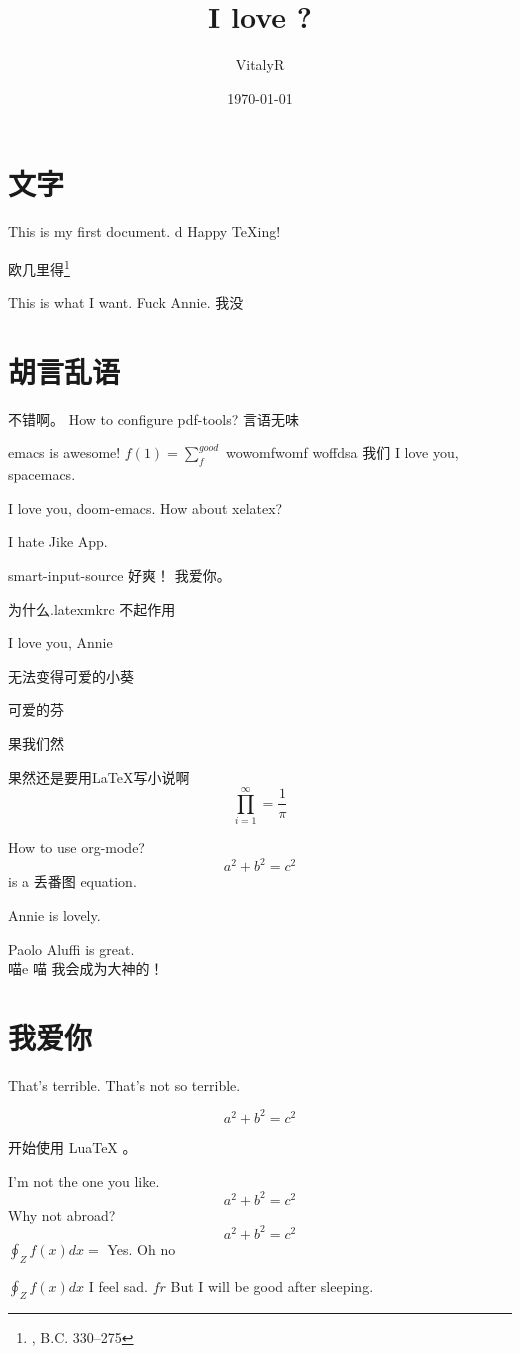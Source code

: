 \documentclass[UTF8]{ctexart}
\title{I love ?}
\author{VitalyR}
\date{\today}
\begin{document}
\maketitle
\tableofcontents

\section{文字}
This is my first document.
d
Happy \TeX ing!

欧几里得\footnote{, B.C. 330--275}

This is what I want.
Fuck Annie.
我没

\section{胡言乱语}

不错啊。
How to configure pdf-tools?
言语无味

emacs is awesome!
\(f(1)=\sum_{f}^{good}\)
wowomfwomf woffdsa
我们
I love you, spacemacs.

I love you, doom-emacs.
How about xelatex?

I hate Jike App.

smart-input-source 好爽！
我爱你。

为什么.latexmkrc 不起作用

I love you, Annie

无法变得可爱的小葵

可爱的芬

果我们然

果然还是要用\LaTeX 写小说啊
\begin{equation}
	\prod_{i=1}^{\infty}=\frac{1}{\pi}
\end{equation}

How to use org-mode?
\[a^{2}+b^{2}=c^{2}\] is a 丢番图 equation.

Annie is lovely.

Paolo Aluffi is great.\\
喵e
喵
我会成为大神的！

\section{我爱你}

That's terrible.
That's not so terrible.

\begin{equation}
	\label{eq:2}
	a^{2}+b^{2}=c^{2}
\end{equation}

开始使用 LuaTeX 。

I'm not the one you like.
\[a^{2}+b^{2}=c^{2}\]
Why not abroad?
\[a^{2}+b^{2}=c^{2}\] \(\oint_{Z}f(x)dx = \) Yes.
Oh
no

\(\oint_{Z}f(x)dx\)
I feel sad.
\(fr\)
But I will be good after sleeping.
\end{document}
